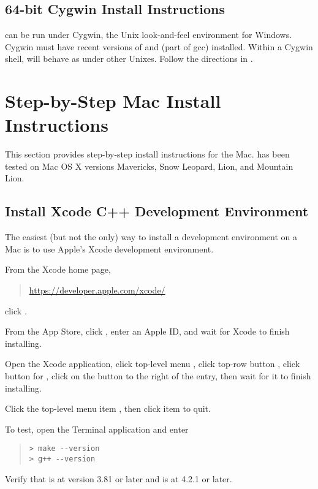 \subsection{64-bit Cygwin Install Instructions}

\CmdStan can be run under Cygwin, the Unix look-and-feel environment
for Windows.  Cygwin must have recent versions of  and
 (part of gcc) installed.  Within a Cygwin shell, \CmdStan
will behave as under other Unixes. Follow the directions in
.



\section{Step-by-Step Mac Install Instructions}\label{install-mac.appendix}

This section provides step-by-step install instructions for the Mac.
\CmdStan has been tested on Mac OS X versions Mavericks, Snow Leopard,
Lion, and Mountain Lion.

\subsection{Install Xcode C++ Development Environment}

The easiest (but not the only) way to install a \Cpp development
environment on a Mac is to use Apple's Xcode development environment.

From the Xcode home page,
%
\begin{quote}
\url{https://developer.apple.com/xcode/}
\end{quote}
%
click .

From the App Store, click , enter an Apple ID,
and wait for Xcode to finish installing.

Open the Xcode application, click top-level menu
, click top-row button ,
click button for , click on the 
button to the right of the  entry, then
wait for it to finish installing.

Click the top-level menu item , then click item
 to quit.

To test, open the Terminal application and enter

\begin{quote}
\begin{Verbatim}[fontshape=sl,fontsize=\small]
> make --version
> g++ --version
\end{Verbatim}
\end{quote}
%
Verify that  is at version 3.81 or later and 
is at 4.2.1 or later.


